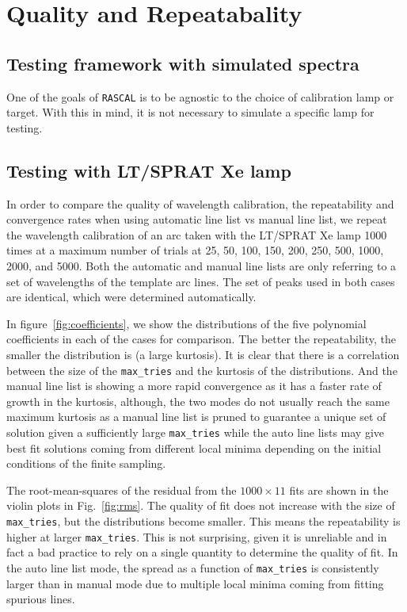 \documentclass{aa}
\begin{document}
\section{Quality and Repeatabality}

\subsection{Testing framework with simulated spectra}

One of the goals of \texttt{RASCAL} is to be agnostic to the choice of calibration
lamp or target. With  this in mind, it is not necessary to simulate a specific
lamp for testing.


\subsection{Testing with LT/SPRAT Xe lamp}

In order to compare the quality of wavelength calibration, the repeatability and
convergence rates when using automatic line list vs manual line list, we repeat the
wavelength calibration of an arc taken with the LT/SPRAT Xe lamp 1000 times at a
maximum number of trials at 25, 50, 100, 150, 200, 250, 500, 1000, 2000, and 5000.
Both the automatic and manual line lists are only referring to a set of wavelengths
of the template arc lines. The set of peaks used in both cases are identical, which
were determined automatically.

In figure~\ref{fig:coefficients}, we show the distributions of the five polynomial
coefficients in each of the cases for comparison. The better the repeatability, the
smaller the distribution is (a large kurtosis). It is clear that there is a correlation
between the size of the \texttt{max\_tries} and the kurtosis of the distributions. And
the manual line list is showing a more rapid convergence as it has a faster rate of
growth in the kurtosis, although, the two modes do not usually reach the same maximum
kurtosis as a manual line list is pruned to guarantee a unique set of solution given a
sufficiently large \texttt{max\_tries} while the auto line lists may give best fit
solutions coming from different local minima depending on the initial conditions of
the finite sampling.

The root-mean-squares of the residual from the $1000 \times 11$ fits are shown in the
violin plots in Fig.~\ref{fig:rms}. The quality of fit does not increase with the size
of \texttt{max\_tries}, but the distributions become smaller. This means the
repeatability is higher at larger \texttt{max\_tries}. This is not surprising, given
it is unreliable and in fact a bad practice to rely on a single quantity to determine
the quality of fit. In the auto line list mode, the spread as a function of
\texttt{max\_tries} is consistently larger than in manual mode due to multiple local
minima coming from fitting spurious lines.
\end{document}
